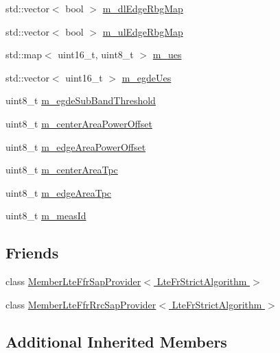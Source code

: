 \begin{DoxyCompactItemize}
std\+::vector$<$ bool $>$ \hyperlink{classns3_1_1LteFrStrictAlgorithm_a9d8a403af433d1f6859a9e4ad4ff5c9d}{m\+\_\+dl\+Edge\+Rbg\+Map}
\item 
std\+::vector$<$ bool $>$ \hyperlink{classns3_1_1LteFrStrictAlgorithm_ad6f85672034013a8482a0fa6fbd87d7e}{m\+\_\+ul\+Edge\+Rbg\+Map}
\item 
std\+::map$<$ uint16\+\_\+t, uint8\+\_\+t $>$ \hyperlink{classns3_1_1LteFrStrictAlgorithm_a544356f4520ab4afc2af7fb03c02cf17}{m\+\_\+ues}
\item 
std\+::vector$<$ uint16\+\_\+t $>$ \hyperlink{classns3_1_1LteFrStrictAlgorithm_ae51c75f6a9b08945f4d527e6af1e3551}{m\+\_\+egde\+Ues}
\item 
uint8\+\_\+t \hyperlink{classns3_1_1LteFrStrictAlgorithm_a5b90b8eb56e8cbe457a0ea2f21f68dfe}{m\+\_\+egde\+Sub\+Band\+Threshold}
\item 
uint8\+\_\+t \hyperlink{classns3_1_1LteFrStrictAlgorithm_a02eba937bcdfdd0ae9d6b7840f410611}{m\+\_\+center\+Area\+Power\+Offset}
\item 
uint8\+\_\+t \hyperlink{classns3_1_1LteFrStrictAlgorithm_a554783e976accd5fcd06155049f521ef}{m\+\_\+edge\+Area\+Power\+Offset}
\item 
uint8\+\_\+t \hyperlink{classns3_1_1LteFrStrictAlgorithm_a9929a6d0f943421a03a443a2942706bc}{m\+\_\+center\+Area\+Tpc}
\item 
uint8\+\_\+t \hyperlink{classns3_1_1LteFrStrictAlgorithm_a54d8fd8e9cb837daf80f9cc6a477d9c1}{m\+\_\+edge\+Area\+Tpc}
\item 
uint8\+\_\+t \hyperlink{classns3_1_1LteFrStrictAlgorithm_a9c47b199a62a04ca4d051a28b67ae825}{m\+\_\+meas\+Id}
\end{DoxyCompactItemize}
\subsection*{Friends}
\begin{DoxyCompactItemize}
\item 
class \hyperlink{classns3_1_1LteFrStrictAlgorithm_a4aeca98abd4e50beb7941a9df0a4f10b}{Member\+Lte\+Ffr\+Sap\+Provider$<$ Lte\+Fr\+Strict\+Algorithm $>$}
\item 
class \hyperlink{classns3_1_1LteFrStrictAlgorithm_ab7b37ebf98334bf4bea2861a268ac9b0}{Member\+Lte\+Ffr\+Rrc\+Sap\+Provider$<$ Lte\+Fr\+Strict\+Algorithm $>$}
\end{DoxyCompactItemize}
\subsection*{Additional Inherited Members}


